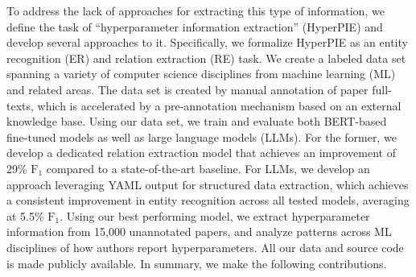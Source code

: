 

To address the lack of approaches for extracting this type of information, we define the task of ``hyperparameter information extraction'' (HyperPIE) and develop several approaches to it. Specifically, we formalize HyperPIE as an entity recognition (ER) and relation extraction (RE) task. We create a labeled data set spanning a variety of computer science disciplines from machine learning (ML) and related areas. The data set is created by manual annotation of paper full-texts, which is accelerated by a pre-annotation mechanism based on an external knowledge base. Using our data set, we train and evaluate both BERT-based~\cite{devlin2019} fine-tuned models as well as large language models (LLMs).
For the former, we develop a dedicated relation extraction model that achieves an improvement of 29\% $\text{F}_1$ compared to a state-of-the-art baseline.
For LLMs, we develop an approach leveraging YAML output for structured data extraction, which achieves a consistent improvement in entity recognition across all tested models, averaging at 5.5\% $\text{F}_1$.
Using our best performing model, we extract hyperparameter information from 
15,000 unannotated papers, and analyze patterns across ML disciplines of how authors report hyperparameters.
All our data and source code is made publicly available.
%
%
In summary, we make the following contributions.

